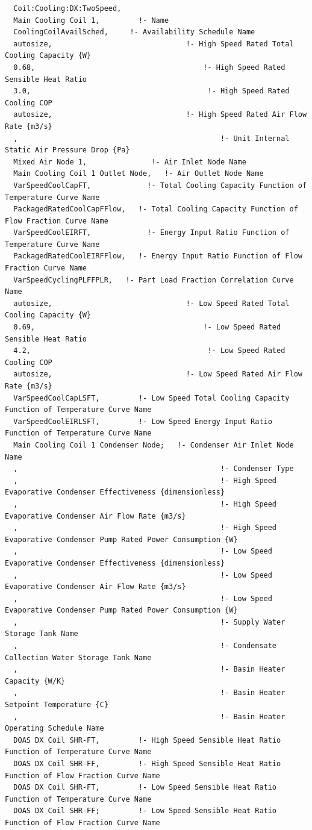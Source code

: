 \begin{lstlisting}
  Coil:Cooling:DX:TwoSpeed,
  Main Cooling Coil 1,         !- Name
  CoolingCoilAvailSched,     !- Availability Schedule Name
  autosize,                               !- High Speed Rated Total Cooling Capacity {W}
  0.68,                                       !- High Speed Rated Sensible Heat Ratio
  3.0,                                         !- High Speed Rated Cooling COP
  autosize,                               !- High Speed Rated Air Flow Rate {m3/s}
  ,                                               !- Unit Internal Static Air Pressure Drop {Pa}
  Mixed Air Node 1,               !- Air Inlet Node Name
  Main Cooling Coil 1 Outlet Node,   !- Air Outlet Node Name
  VarSpeedCoolCapFT,             !- Total Cooling Capacity Function of Temperature Curve Name
  PackagedRatedCoolCapFFlow,   !- Total Cooling Capacity Function of Flow Fraction Curve Name
  VarSpeedCoolEIRFT,             !- Energy Input Ratio Function of Temperature Curve Name
  PackagedRatedCoolEIRFFlow,   !- Energy Input Ratio Function of Flow Fraction Curve Name
  VarSpeedCyclingPLFFPLR,   !- Part Load Fraction Correlation Curve Name
  autosize,                               !- Low Speed Rated Total Cooling Capacity {W}
  0.69,                                       !- Low Speed Rated Sensible Heat Ratio
  4.2,                                         !- Low Speed Rated Cooling COP
  autosize,                               !- Low Speed Rated Air Flow Rate {m3/s}
  VarSpeedCoolCapLSFT,         !- Low Speed Total Cooling Capacity Function of Temperature Curve Name
  VarSpeedCoolEIRLSFT,         !- Low Speed Energy Input Ratio Function of Temperature Curve Name
  Main Cooling Coil 1 Condenser Node;   !- Condenser Air Inlet Node Name
  ,                                               !- Condenser Type
  ,                                               !- High Speed Evaporative Condenser Effectiveness {dimensionless}
  ,                                               !- High Speed Evaporative Condenser Air Flow Rate {m3/s}
  ,                                               !- High Speed Evaporative Condenser Pump Rated Power Consumption {W}
  ,                                               !- Low Speed Evaporative Condenser Effectiveness {dimensionless}
  ,                                               !- Low Speed Evaporative Condenser Air Flow Rate {m3/s}
  ,                                               !- Low Speed Evaporative Condenser Pump Rated Power Consumption {W}
  ,                                               !- Supply Water Storage Tank Name
  ,                                               !- Condensate Collection Water Storage Tank Name
  ,                                               !- Basin Heater Capacity {W/K}
  ,                                               !- Basin Heater Setpoint Temperature {C}
  ,                                               !- Basin Heater Operating Schedule Name
  DOAS DX Coil SHR-FT,         !- High Speed Sensible Heat Ratio Function of Temperature Curve Name
  DOAS DX Coil SHR-FF,         !- High Speed Sensible Heat Ratio Function of Flow Fraction Curve Name
  DOAS DX Coil SHR-FT,         !- Low Speed Sensible Heat Ratio Function of Temperature Curve Name
  DOAS DX Coil SHR-FF;         !- Low Speed Sensible Heat Ratio Function of Flow Fraction Curve Name



\end{lstlisting}
